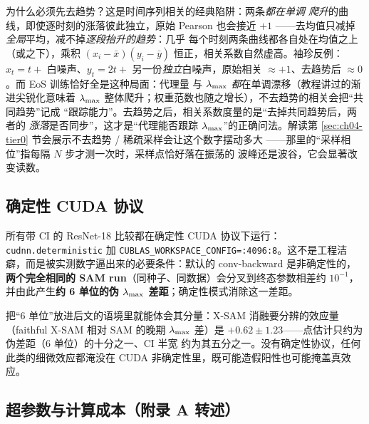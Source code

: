 为什么必须先去趋势？这是时间序列相关的经典陷阱：两条\emph{都在单调
爬升}的曲线，即使逐时刻的涨落彼此独立，原始 Pearson 也会接近 $+1$
——去均值只减掉\emph{全局}平均，减不掉\emph{逐段抬升的趋势}：几乎
每个时刻两条曲线都各自处在均值之上（或之下），乘积
$(x_i-\bar x)(y_i-\bar y)$ 恒正，相关系数自然虚高。袖珍反例：
$x_t=t+$ 白噪声、$y_t=2t+$ 另一份\emph{独立}白噪声，原始相关
$\approx+1$、去趋势后 $\approx0$。而 EoS 训练恰好全是这种局面：代理量
与 $\lambda_{\max}$ \emph{都}在单调漂移（教程讲过的渐进尖锐化意味着 $\lambda_{\max}$
整体爬升；权重范数也随之增长），不去趋势的相关会把“共同趋势”记成
“跟踪能力”。去趋势之后，相关系数度量的是“去掉共同趋势后，两者的
\emph{涨落}是否同步”，这才是“代理能否跟踪 $\lambda_{\max}$”的正确问法。解读第
\ref{sec:ch04-tier0} 节会展示不去趋势 / 稀疏采样会让这个数字摆动多大
——那里的“采样相位”指每隔 $N$ 步才测一次时，采样点恰好落在振荡的
波峰还是波谷，它会显著改变读数。

\subsection{确定性 CUDA 协议}
\label{sec:ch03-determinism}

所有带 CI 的 ResNet-18 比较都在确定性 CUDA 协议下运行：\texttt{cudnn.deterministic}
加
\texttt{CUBLAS\_WORKSPACE\_CONFIG=:4096:8}。这不是工程洁癖，而是被实测数字逼出来的必要条件：默认的
conv-backward 是非确定性的，\textbf{两个完全相同的 SAM
run}（同种子、同数据）会分叉到终态参数相差约 $10^{-1}$，并由此产生\textbf{约 6
单位的伪 $\lambda_{\max}$ 差距}；确定性模式消除这一差距。

把“6 单位”放进后文的语境里就能体会其分量：X-SAM 消融要分辨的效应量（faithful X-SAM
相对 SAM 的晚期 $\lambda_{\max}$ 差）是
$+0.62\pm1.23$——点估计只约为伪差距（$6$ 单位）的十分之一、CI 半宽
约为其五分之一。没有确定性协议，任何此类的细微效应都淹没在
CUDA 非确定性里，既可能造假阳性也可能掩盖真效应。

\subsection{超参数与计算成本（附录 A 转述）}
\label{sec:ch03-hyper}

